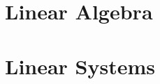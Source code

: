 \documentclass{beamer}
\begin{document}
\newcommand{\stateThree}[3]{
  \begin{array}{r}
    \mbox{\fontsize{6}{6}\selectfont $#1$} \\  
    \mbox{\fontsize{6}{6}\selectfont $#2$} \\ 
    \mbox{\fontsize{6}{6}\selectfont $#3$}
  \end{array}
}





\newcommand{\detTwo}[4]{
  \left|
  \begin{array}{rr}
    #1 & #2 \\
    #3 & #4
  \end{array}
  \right|
}



\newcommand{\detThree}[9]{
  \left|
    \begin{array}{rrr}
      #1 & #2 & #3 \\
      #4 & #5 & #6 \\
      #7 & #8 & #9
    \end{array}
  \right|
}




\newcommand{\startRowFour}{
  \left[
    \begin{array}{rrrr}
}

\newcommand{\oneRowFour}[4] {
      #1 & #2 & #3 & #4 \\
}





\part{Linear Algebra}



\part{Linear Systems}







\newcommand{\startRowOpsTwo}{
  \left[
    \begin{array}{rr|rr}
}

\newcommand{\oneRowOpsTwo}[4] {
      #1 & #2 & #3 & #4 \\
}


\newcommand{\startRowOpsThree}{
  \left[
    \begin{array}{rrr|rrr}
}
\end{document}
